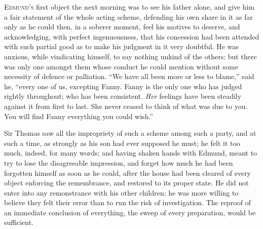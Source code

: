 \documentclass{article}
\newcommand{\gintro}[1]{\textcolor{gcolor}{\textsc{#1}}}
\begin{document}
\gintro{Edmund's} first object the next morning was to see his
father alone, and give him a fair statement of the whole
acting scheme, defending his own share in it as far only
as he could then, in a soberer moment, feel his motives
to deserve, and acknowledging, with perfect ingenuousness,
that his concession had been attended with such partial
good as to make his judgment in it very doubtful.
He was anxious, while vindicating himself, to say nothing
unkind of the others:  but there was only one amongst them
whose conduct he could mention without some necessity
of defence or palliation.  ``We have all been more or less
to blame,'' said he, ``every one of us, excepting Fanny.
Fanny is the only one who has judged rightly throughout;
who has been consistent.  \emph{Her} feelings have been steadily
against it from first to last.  She never ceased to think
of what was due to you.  You will find Fanny everything you
could wish.''

Sir Thomas saw all the impropriety of such a scheme among
such a party, and at such a time, as strongly as his son
had ever supposed he must; he felt it too much, indeed,
for many words; and having shaken hands with Edmund,
meant to try to lose the disagreeable impression,
and forget how much he had been forgotten himself as soon
as he could, after the house had been cleared of every
object enforcing the remembrance, and restored to its
proper state.  He did not enter into any remonstrance with
his other children:  he was more willing to believe they
felt their error than to run the risk of investigation.
The reproof of an immediate conclusion of everything,
the sweep of every preparation, would be sufficient.
\end{document}
